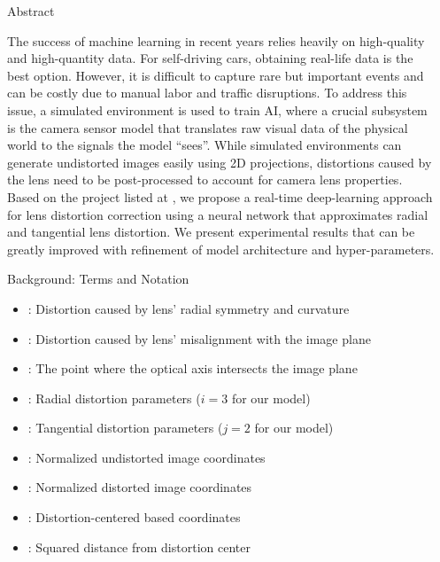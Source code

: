 \documentclass[final,16pt]{beamer}
\newlength{\sepwidth}
\newlength{\colwidth}
\newcommand{\separatorcolumn}{\begin{column}{\sepwidth}\end{column}}
\begin{document}
\begin{frame}[t]
  \begin{columns}[t]
    \separatorcolumn

    \begin{column}{\colwidth}

      \begin{block}{Abstract}

        The success of machine learning in recent years relies heavily on high-quality and high-quantity data. For self-driving cars, obtaining real-life data is the best option. However, it is difficult to capture rare but important events and can be costly due to manual labor and traffic disruptions. To address this issue, a simulated environment is used to train AI, where a crucial subsystem is the camera sensor model that translates raw visual data of the physical world to the signals the model “sees”. While simulated environments can generate undistorted images easily using 2D projections, distortions caused by the lens need to be post-processed to account for camera lens properties. Based on the project listed at \cite{mathworks_innovation}, we propose a real-time deep-learning approach for lens distortion correction using a neural network that approximates radial and tangential lens distortion. We present experimental results that can be greatly improved with refinement of model architecture and hyper-parameters.

      \end{block}

      \begin{block}{Background: Terms and Notation}
        \begin{itemize}
          \item {}: Distortion caused by lens' radial symmetry and curvature
          \item {}: Distortion caused by lens' misalignment with the image plane
          \item {}: The point where the optical axis intersects the image plane
          \item {}: Radial distortion parameters ($i = 3$ for our model)
          \item {}: Tangential distortion parameters ($j = 2$ for our model)
          \item {}: Normalized undistorted image coordinates
          \item {}: Normalized distorted image coordinates
          \item \makebox[10cm][l]{$\bar{\cdot}\quad$}: Distortion-centered based coordinates
          \item {}: Squared distance from distortion center
        \end{itemize}
      \end{block}


\end{column}
\end{columns}
\end{frame}
\end{document}
